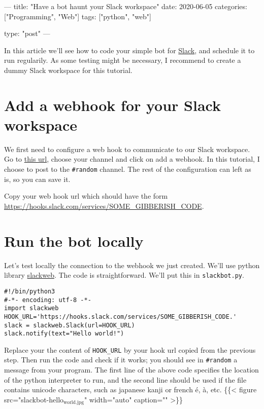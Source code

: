 \documentclass[11pt]{article}
\author{Adam Oudad}
\date{\today}
\title{}
\begin{document}
\tableofcontents

---
title: "Have a bot haunt your Slack workspace"
date: 2020-06-05
categories: ["Programming", "Web"]
tags: ["python", "web"]

type: "post"
---

In this article we'll see how to code your simple bot for \href{https://slack.com}{Slack}, and schedule it to run regularily. As some testing might be necessary, I recommend to create a dummy Slack workspace for this tutorial.
\section{Add a webhook for your Slack workspace}
\label{sec:orgfbfa60b}
We first need to configure a web hook to communicate to our Slack workspace. Go to \href{https://my.slack.com/services/new/incoming-webhook/}{this url}, choose your channel and click on add a webhook. In this tutorial, I choose to post to the \texttt{\#random} channel. The rest of the configuration can left as is, so you can save it.

Copy your web hook url which should have the form \url{https://hooks.slack.com/services/SOME\_GIBBERISH\_CODE}.
\section{Run the bot locally}
\label{sec:orgc278e1e}
Let's test locally the connection to the webhook we just created. We'll use python library \href{https://github.com/satoshi03/slack-python-webhook}{slackweb}. The code is straightforward. We'll put this in \texttt{slackbot.py}.
\begin{verbatim}
#!/bin/python3
#-*- encoding: utf-8 -*-
import slackweb
HOOK_URL='https://hooks.slack.com/services/SOME_GIBBERISH_CODE.'
slack = slackweb.Slack(url=HOOK_URL)
slack.notify(text="Hello world!")
\end{verbatim}
Replace your the content of \texttt{HOOK\_URL} by your hook url copied from the previous step. Then run the code and check if it works; you should see in \texttt{\#random} a message from your program. The first line of the above code specifies the location of the python interpreter to run, and the second line should be used if the file contains unicode characters, such as japanese kanji or french é, à, etc.
\{\{< figure src="slackbot-hello\(_{\text{world.jpg}}\)" width="auto" caption="" >\}\}
\end{document}
